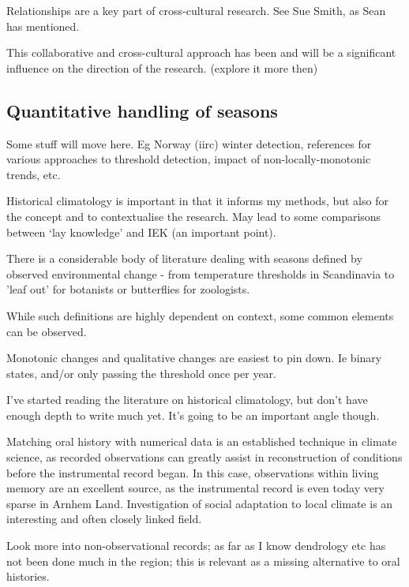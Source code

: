 Relationships are a key part of cross-cultural research.  See Sue Smith, as
Sean has mentioned.

This collaborative and cross-cultural approach has been and will be a
significant influence on the direction of the research. (explore it more then)



\subsection{Quantitative handling of seasons}

Some stuff will move here.  Eg Norway (iirc) winter detection,
references for various approaches to threshold detection,
impact of non-locally-monotonic trends, etc.

Historical climatology is important in that it informs my methods,
but also for the concept and to contextualise the research.  May lead to
some comparisons between `lay knowledge' and IEK (an important point).


There is a considerable body of literature dealing with seasons defined
by observed environmental change - from temperature thresholds in
Scandinavia to 'leaf out' for botanists or butterflies for zoologists.

While such definitions are highly dependent on context, some common
elements can be observed.

Monotonic changes and qualitative changes are easiest to pin down.
Ie binary states, and/or only passing the threshold once per year.


I've started reading the literature on historical climatology, but don't have
enough depth to write much yet.  It's going to be an important angle though.

Matching oral history with numerical data is an established technique in
climate science, as recorded observations can greatly assist in reconstruction
of conditions before the instrumental record began.  In this case, observations
within living memory are an excellent source, as the instrumental record is
even today very sparse in Arnhem Land.  Investigation of social adaptation to
local climate is an interesting and often closely linked field.

Look more into non-observational records; as far as I know dendrology etc has
not been done much in the region; this is relevant as a missing alternative to
oral histories.
